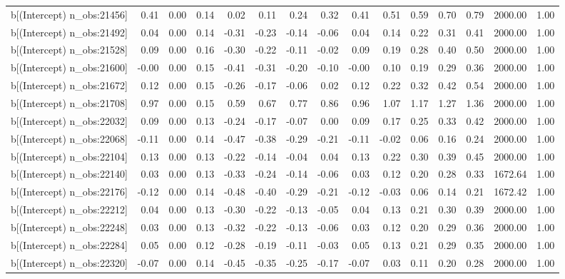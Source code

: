 \begin{table}[ht]
\begin{tabular}{rrrrrrrrrrrrrrr}
  b[(Intercept) n\_obs:21456] & 0.41 & 0.00 & 0.14 & 0.02 & 0.11 & 0.24 & 0.32 & 0.41 & 0.51 & 0.59 & 0.70 & 0.79 & 2000.00 & 1.00 \\ 
  b[(Intercept) n\_obs:21492] & 0.04 & 0.00 & 0.14 & -0.31 & -0.23 & -0.14 & -0.06 & 0.04 & 0.14 & 0.22 & 0.31 & 0.41 & 2000.00 & 1.00 \\ 
  b[(Intercept) n\_obs:21528] & 0.09 & 0.00 & 0.16 & -0.30 & -0.22 & -0.11 & -0.02 & 0.09 & 0.19 & 0.28 & 0.40 & 0.50 & 2000.00 & 1.00 \\ 
  b[(Intercept) n\_obs:21600] & -0.00 & 0.00 & 0.15 & -0.41 & -0.31 & -0.20 & -0.10 & -0.00 & 0.10 & 0.19 & 0.29 & 0.36 & 2000.00 & 1.00 \\ 
  b[(Intercept) n\_obs:21672] & 0.12 & 0.00 & 0.15 & -0.26 & -0.17 & -0.06 & 0.02 & 0.12 & 0.22 & 0.32 & 0.42 & 0.54 & 2000.00 & 1.00 \\ 
  b[(Intercept) n\_obs:21708] & 0.97 & 0.00 & 0.15 & 0.59 & 0.67 & 0.77 & 0.86 & 0.96 & 1.07 & 1.17 & 1.27 & 1.36 & 2000.00 & 1.00 \\ 
  b[(Intercept) n\_obs:22032] & 0.09 & 0.00 & 0.13 & -0.24 & -0.17 & -0.07 & 0.00 & 0.09 & 0.17 & 0.25 & 0.33 & 0.42 & 2000.00 & 1.00 \\ 
  b[(Intercept) n\_obs:22068] & -0.11 & 0.00 & 0.14 & -0.47 & -0.38 & -0.29 & -0.21 & -0.11 & -0.02 & 0.06 & 0.16 & 0.24 & 2000.00 & 1.00 \\ 
  b[(Intercept) n\_obs:22104] & 0.13 & 0.00 & 0.13 & -0.22 & -0.14 & -0.04 & 0.04 & 0.13 & 0.22 & 0.30 & 0.39 & 0.45 & 2000.00 & 1.00 \\ 
  b[(Intercept) n\_obs:22140] & 0.03 & 0.00 & 0.13 & -0.33 & -0.24 & -0.14 & -0.06 & 0.03 & 0.12 & 0.20 & 0.28 & 0.33 & 1672.64 & 1.00 \\ 
  b[(Intercept) n\_obs:22176] & -0.12 & 0.00 & 0.14 & -0.48 & -0.40 & -0.29 & -0.21 & -0.12 & -0.03 & 0.06 & 0.14 & 0.21 & 1672.42 & 1.00 \\ 
  b[(Intercept) n\_obs:22212] & 0.04 & 0.00 & 0.13 & -0.30 & -0.22 & -0.13 & -0.05 & 0.04 & 0.13 & 0.21 & 0.30 & 0.39 & 2000.00 & 1.00 \\ 
  b[(Intercept) n\_obs:22248] & 0.03 & 0.00 & 0.13 & -0.32 & -0.22 & -0.13 & -0.06 & 0.03 & 0.12 & 0.20 & 0.29 & 0.36 & 2000.00 & 1.00 \\ 
  b[(Intercept) n\_obs:22284] & 0.05 & 0.00 & 0.12 & -0.28 & -0.19 & -0.11 & -0.03 & 0.05 & 0.13 & 0.21 & 0.29 & 0.35 & 2000.00 & 1.00 \\ 
  b[(Intercept) n\_obs:22320] & -0.07 & 0.00 & 0.14 & -0.45 & -0.35 & -0.25 & -0.17 & -0.07 & 0.03 & 0.11 & 0.20 & 0.28 & 2000.00 & 1.00 \\ 

\end{tabular}
\end{table}
